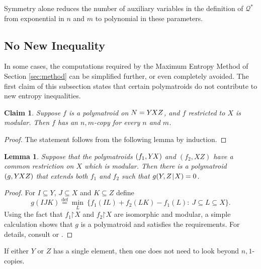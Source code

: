 \documentclass[reqno]{amsart}
\newtheorem{lemma}[theorem]{Lemma}
\newtheorem{claim}[theorem]{Claim}
\theoremstyle{definition}
\def\|{\mkern1.5mu{|}\mkern1.5mu}
\def\restr{\mathord\upharpoonright}
\newcommand\eqdef{\stackrel{\mathrm{def}}{=}}
\def\YXZ{Y\mkern-2mu XZ}
\def\YX{Y\mkern-2mu X}
\begin{document}
Symmetry alone reduces the number of auxiliary variables in the definition
of $\mathcal Q^*$ from exponential in $n$ and $m$ to polynomial in these
parameters.

\subsection{No New Inequality}

In some cases, the computations required by the Maximum Entropy Method of
Section \ref{sec:method} can be simplified further, or even completely
avoided. The first claim of this subsection states that certain polymatroids
do not contribute to new entropy inequalities.

\begin{claim}\label{claim:modularX}
Suppose $f$ is a polymatroid on $N=\YXZ$, and $f$ restricted to $X$ is
modular. Then $f$ has an $n,m$-copy for every $n$ and $m$.
\end{claim}
\begin{proof}
The statement follows from the following lemma by induction.
\end{proof}

\begin{lemma}\label{lemma:minconstr}
Suppose that the polymatroids $(f_1,\YX)$ and $(f_2,XZ)$ have a common
restriction on $X$ which is modular. Then there is a polymatroid
$(g,\YXZ)$ that extends both $f_1$ and $f_2$ such that $g(Y,Z\|X)=0$.
\end{lemma}

\begin{proof}
For $I\subseteq Y$, $J\subseteq X$ and $K\subseteq Z$ define
$$
  g(IJK) \eqdef \min_L ~ \{ 
      f_1(IL)+ f_2(LK) - f_1(L) : ~ J\subseteq L\subseteq X \}.
$$
Using the fact that $f_1\restr X$ and $f_2\restr X$ are isomorphic
and modular, a simple calculation shows that $g$ is a polymatroid
and satisfies the requirements. For details, consult
\cite{Csirmaz.oneadhesive,exploring} or \cite{M.fmadhe}.
\end{proof}

If either $Y$ or $Z$ has a single element, then one does not need to
look beyond $n,1$-copies.
\end{document}
